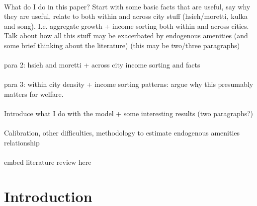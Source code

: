 \documentclass[]{article}
\begin{document}
	\paragraph*{}
	What do I do in this paper? Start with some basic facts that are useful, say why they are useful, relate to both within and across city stuff (hsieh/moretti, kulka and song). I.e. aggregate growth + income sorting both within and across cities. Talk about how all this stuff may be exacerbated by endogenous amenities (and some brief thinking about the literature) (this may be two/three paragraphs) 
	
	\paragraph*{}
	para 2: hsieh and moretti + across city income sorting and facts 
	
	\paragraph*{}
	para 3: within city density + income sorting patterns: argue why this presumably matters for welfare. 
	
	\paragraph*{}
	Introduce what I do with the model + some interesting results (two paragraphs?)
	
	\paragraph*{}
	Calibration, other difficulties, methodology to estimate endogenous amenities relationship
	
	\paragraph*{}
	embed literature review here
	
	
	\newpage	
	\section{Introduction}
		
	\paragraph*{}
	
\end{document}
